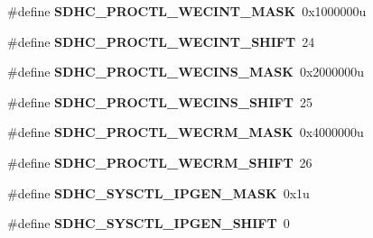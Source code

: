 \begin{DoxyCompactItemize}
\item 
\#define {\bfseries S\+D\+H\+C\+\_\+\+P\+R\+O\+C\+T\+L\+\_\+\+W\+E\+C\+I\+N\+T\+\_\+\+M\+A\+SK}~0x1000000u\hypertarget{group__SDHC__Register__Masks_ga08649036ee7355491608a89004ab0628}{}\label{group__SDHC__Register__Masks_ga08649036ee7355491608a89004ab0628}

\item 
\#define {\bfseries S\+D\+H\+C\+\_\+\+P\+R\+O\+C\+T\+L\+\_\+\+W\+E\+C\+I\+N\+T\+\_\+\+S\+H\+I\+FT}~24\hypertarget{group__SDHC__Register__Masks_ga575db16a4ed36389472243d329f5ec7c}{}\label{group__SDHC__Register__Masks_ga575db16a4ed36389472243d329f5ec7c}

\item 
\#define {\bfseries S\+D\+H\+C\+\_\+\+P\+R\+O\+C\+T\+L\+\_\+\+W\+E\+C\+I\+N\+S\+\_\+\+M\+A\+SK}~0x2000000u\hypertarget{group__SDHC__Register__Masks_gabd871a9e13415808e1743df5b4758d83}{}\label{group__SDHC__Register__Masks_gabd871a9e13415808e1743df5b4758d83}

\item 
\#define {\bfseries S\+D\+H\+C\+\_\+\+P\+R\+O\+C\+T\+L\+\_\+\+W\+E\+C\+I\+N\+S\+\_\+\+S\+H\+I\+FT}~25\hypertarget{group__SDHC__Register__Masks_ga33b81350df7f8c5cc698135c271bbfbb}{}\label{group__SDHC__Register__Masks_ga33b81350df7f8c5cc698135c271bbfbb}

\item 
\#define {\bfseries S\+D\+H\+C\+\_\+\+P\+R\+O\+C\+T\+L\+\_\+\+W\+E\+C\+R\+M\+\_\+\+M\+A\+SK}~0x4000000u\hypertarget{group__SDHC__Register__Masks_ga296669c47b763f48caf28c35c1be2240}{}\label{group__SDHC__Register__Masks_ga296669c47b763f48caf28c35c1be2240}

\item 
\#define {\bfseries S\+D\+H\+C\+\_\+\+P\+R\+O\+C\+T\+L\+\_\+\+W\+E\+C\+R\+M\+\_\+\+S\+H\+I\+FT}~26\hypertarget{group__SDHC__Register__Masks_ga6f445b202ea272428a7507952b79a889}{}\label{group__SDHC__Register__Masks_ga6f445b202ea272428a7507952b79a889}

\item 
\#define {\bfseries S\+D\+H\+C\+\_\+\+S\+Y\+S\+C\+T\+L\+\_\+\+I\+P\+G\+E\+N\+\_\+\+M\+A\+SK}~0x1u\hypertarget{group__SDHC__Register__Masks_ga35cc08217531a736cec185c65abe7f82}{}\label{group__SDHC__Register__Masks_ga35cc08217531a736cec185c65abe7f82}

\item 
\#define {\bfseries S\+D\+H\+C\+\_\+\+S\+Y\+S\+C\+T\+L\+\_\+\+I\+P\+G\+E\+N\+\_\+\+S\+H\+I\+FT}~0\hypertarget{group__SDHC__Register__Masks_ga9ef6104b46076dd92183a99579d95771}{}\label{group__SDHC__Register__Masks_ga9ef6104b46076dd92183a99579d95771}


\end{DoxyCompactItemize}
